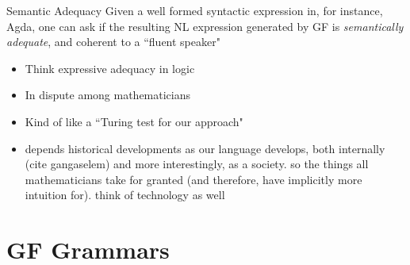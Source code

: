 \documentclass[10pt]{beamer}
\begin{document}
\begin{frame}

\begin{block}{Semantic Adequacy}
  Given a well formed syntactic expression in, for instance, Agda, one
can ask if the resulting NL expression generated by GF is
\emph{semantically adequate}, and coherent to a ``fluent speaker"

\end{block}

\begin{itemize}
  \item Think expressive adequacy in logic
  \item In dispute among mathematicians
  \item Kind of like a ``Turing test for our approach" %
  \item depends historical developments as our language develops, both
    internally (cite gangaselem) and more interestingly, as a society.
    so the
    things all mathematicians take for granted (and therefore, have implicitly
    more intuition for).  think of technology as well

\end{itemize}


\end{frame}

\section{GF Grammars}

\begin{frame}[fragile]
\centering
{}
\end{frame}
\end{document}
